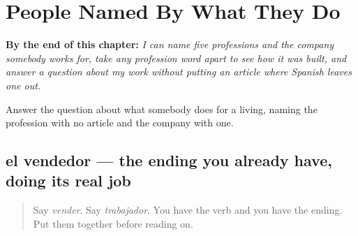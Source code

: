 
\chapter{People Named By What They Do}
\label{ch:oficios}

\begin{chapteropening}
\textbf{By the end of this chapter:} \emph{I can name five professions and the company somebody works for, take any profession word apart to see how it was built, and answer a question about my work without putting an article where Spanish leaves one out.}

Answer the question about what somebody does for a living, naming the profession with no article and the company with one.
\end{chapteropening}

\section[el vendedor]{el vendedor — the ending you already have, doing its real job}

\label{lesson:ES-C427-vendedor}



\begin{quote}
Say \emph{vender}. Say \emph{trabajador}. You have the verb and you have the ending. Put them together before reading on.
\end{quote}


